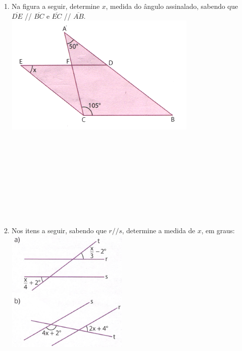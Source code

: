 \documentclass[a4paper,14pt]{article}
\begin{document}
\begin{multicols}{2}
\begin{enumerate}
\begin{enumerate}[a)]
			\end{enumerate}
			\item Na figura a seguir, determine $x$, medida do ângulo assinalado, sabendo que $\overline{DE}$ // $\overline{BC}$ e $\overline{EC}$ // $\overline{AB}$. \\
			\includegraphics[width=1\linewidth]{6FMA144_imagens/imagem8} \\\\\\\\\\\\\\\\\\\\
			\item Nos itens a seguir, sabendo que $r // s$, determine a medida de $x$, em graus:
			\includegraphics[width=1\linewidth]{6FMA144_imagens/imagem9} \\\\\\

\end{enumerate}
\end{multicols}
\end{document}
